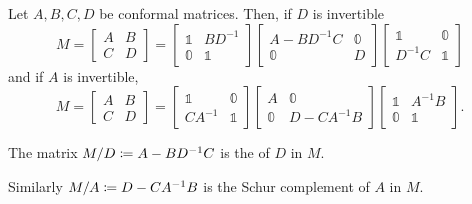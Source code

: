 \begin{lemma}
Let $A,B,C,D$ be conformal matrices. Then, if $D$ is invertible 
\[ M = \begin{bmatrix}
A & B \\ C & D
\end{bmatrix} = \begin{bmatrix}
\mathbb{1} & BD^{-1} \\ \mathbb{0} & \mathbb{1}
\end{bmatrix}\begin{bmatrix}
A-BD^{-1}C & \mathbb{0} \\ \mathbb{0} & D
\end{bmatrix}\begin{bmatrix}
\mathbb{1} & \mathbb{0} \\ D^{-1}C & \mathbb{1}
\end{bmatrix}  \]
and if $A$ is invertible,
\[ M = \begin{bmatrix}
A & B \\ C & D
\end{bmatrix} = \begin{bmatrix}
\mathbb{1} & \mathbb{0} \\ CA^{-1} & \mathbb{1}
\end{bmatrix}\begin{bmatrix}
A & \mathbb{0} \\ \mathbb{0} & D - CA^{-1}B
\end{bmatrix}\begin{bmatrix}
\mathbb{1} & A^{-1}B \\ \mathbb{0} & \mathbb{1}
\end{bmatrix}.  \]
\end{lemma}
\begin{definition}
The matrix $M/D \coloneqq A-BD^{-1}C$ is the  of $D$ in $M$.

Similarly $M/A \coloneqq D-CA^{-1}B$ is the Schur complement of $A$ in $M$.
\end{definition}
